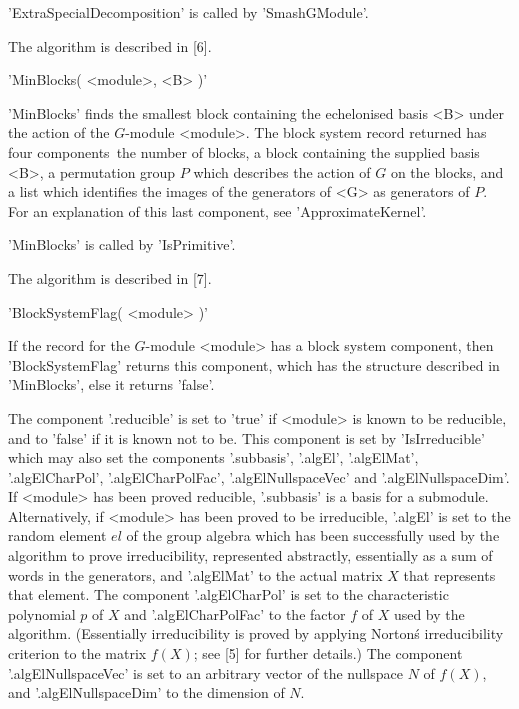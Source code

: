 'ExtraSpecialDecomposition' is called by 'SmashGModule'.

The algorithm is described in [6].


'MinBlocks( <module>, <B> )'
 
'MinBlocks' finds the smallest block containing the echelonised basis <B>
under  the action of the   $G$-module <module>.  The block system  record
returned has four components\:\ the number  of blocks, a block containing
the supplied basis <B>,   a permutation group   $P$ which  describes  the
action  of $G$ on the  blocks, and a list which  identifies the images of
the generators of <G>  as generators of $P$.  For an explanation of  this
last component, see 'ApproximateKernel'.

'MinBlocks' is called by 'IsPrimitive'.

The algorithm is described in [7].


'BlockSystemFlag( <module> )' 

If  the record for the $G$-module  <module> has a block system component,
then  'Block\-System\-Flag'   returns  this  component,  which   has  the
structure described in 'Min\-Blocks', else it returns 'false'.


The component  '.reducible' is set to 'true'  if <module> is  known to be
reducible, and to  'false' if it  is known not  to be.  This component is
set  by 'IsIrreducible' which  may also  set the components  '.subbasis',
'.algEl',   '.algElMat',       '.algElCharPol',       '.algElCharPolFac',
'.algElNullspaceVec'  and  '.algElNullspaceDim'.   If   <module> has been
proved reducible, '.subbasis' is a basis for a submodule.  Alternatively,
if <module> has been proved  to be irreducible, '.algEl'   is set to  the
random element $el$ of the group algebra which has been successfully used
by  the    algorithm  to prove irreducibility,    represented abstractly,
essentially as a sum of  words in the generators,  and '.algElMat' to the
actual   matrix  $X$   that  represents   that    element.  The component
'.algElCharPol'  is set to the characteristic  polynomial  $p$ of $X$ and
'.algElCharPolFac'   to the factor $f$    of $X$ used  by the  algorithm.
(Essentially  irreducibility    is   proved   by    applying    Norton\'s
irreducibility criterion to   the matrix  $f(X)$;   see [5]  for  further
details.)    The component '.algElNullspaceVec'  is   set to an arbitrary
vector  of the nullspace $N$  of $f(X)$,  and '.algElNullspaceDim' to the
dimension of $N$.

